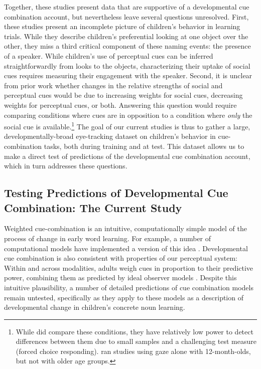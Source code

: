 \documentclass[man,floatsintext]{apa6}
\begin{document}
Together, these studies present data that are supportive of a developmental cue combination account, but nevertheless leave several questions unresolved. First, these studies present an incomplete picture of children's behavior in learning trials. While they describe children's preferential looking at one object over the other, they miss a third critical component of these naming events: the presence of a speaker. While children's use of perceptual cues can be inferred straightforwardly from looks to the objects, characterizing their uptake of social cues requires measuring their engagement with the speaker. Second, it is unclear from prior work whether changes in the relative strengths of social and perceptual cues would be due to increasing weights for social cues, decreasing weights for perceptual cues, or both. Answering this question would require comparing conditions where cues are in opposition to a condition where \emph{only} the social cue is available.\footnote{While  did compare these conditions, they have relatively low power to detect differences between them due to small samples and a challenging test measure (forced choice responding).  ran studies using gaze alone with 12-month-olds, but not with older age groups.} The goal of our current studies is thus to gather a large, developmentally-broad eye-tracking dataset on children's behavior in cue-combination tasks, both during training and at test. This dataset allows us to make a direct test of predictions of the developmental cue combination account, which in turn addresses these questions.

\subsection{Testing Predictions of Developmental Cue Combination: The Current Study}

Weighted cue-combination is an intuitive, computationally simple model of the process of change in early word learning. For example, a number of computational models have implemented a version of this idea  \cite{Frank2007b,Yu2007b,Frank2013a}. Developmental cue combination is also consistent with properties of our perceptual system: Within and across modalities, adults weigh cues in proportion to their predictive power, combining them as predicted by ideal observer models \cite{Ernst2002, Jacobs2002}. Despite this intuitive plausibility, a number of detailed predictions of cue combination models remain untested, specifically as they apply to these models as a description of developmental change in children's concrete noun learning. 
\end{document}
